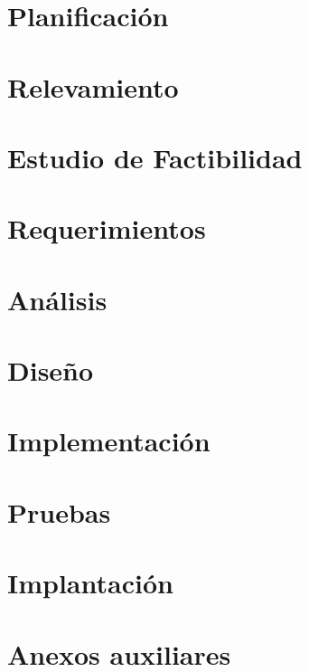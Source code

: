 \documentclass[12pt,a4paper]{book}
\begin{document}
	\raggedbottom
	\frontmatter
	
	\cleardoublepage
	\pagestyle{plain}
	\setcounter{page}{3}
	
	\cleardoublepage
	\tableofcontents
	\listoffigures
	\listoftables
	\cleardoublepage
	\mainmatter
	\pagestyle{fancy}
	\fancyhead{}
	\fancyfoot{}
	\fancyfoot[RE,RO]{\thepage}
	\chapter{Planificaci\'on}
	
	\chapter{Relevamiento}
	
	\chapter[Factibilidad]{Estudio de Factibilidad}
	
	\chapter{Requerimientos}
	
	\chapter{An\'alisis}
	
	\chapter{Dise\~no}
	
	\chapter{Implementaci\'on}
	
	\chapter{Pruebas}
	
	\chapter{Implantaci\'on}
	
	\cleardoublepage
	\appendix
	\pagestyle{fancy}
	\chapter{Anexos auxiliares}
	
\end{document}
